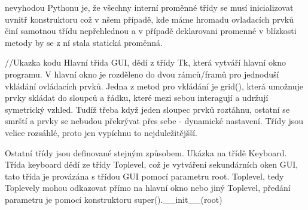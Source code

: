 nevyhodou Pythonu je, že všechny interní proměnné třídy se musí inicializovat uvnitř konstruktoru což v nšem případě, kde máme hromadu ovladacích prvků činí samotnou třídu nepřehlednou a v případě deklarovani promenné v blízkosti metody by se z ní stala statická proměnná. 

//Ukazka kodu
Hlavní třída GUI, dědí z třídy Tk, která vytváří hlavní okno programu. V hlavní okno je rozděleno do dvou rámců/framů pro jednoduší vkládání ovládacích prvků. Jedna z metod pro vkládání je grid(), která umožnuje prvky skládat do sloupců a řádku, které mezi sebou interagují a udržují symetrický vzhled. Tudíž třeba když jeden sloupec prvků roztáhnu, ostatní se smrští a prvky se nebudou překrývat přes sebe - dynamické nastavení. Třídy jsou velice rozsáhlé, proto jen vypíchnu to nejduležitějšší.
%
%

Ostatní třídy jsou definované stejným způsobem. Ukázka na třídě Keyboard. Třída keyboard dědí ze třídy Toplevel, což je vytváření sekundárních oken GUI, tato třída je provázána s třídou GUI pomocí parametru root. Toplevel, tedy Toplevely mohou odkazovat přímo na hlavní okno nebo jiný Toplevel, předání parametru je pomocí konstruktoru super().\_\_init\_\_(root)

